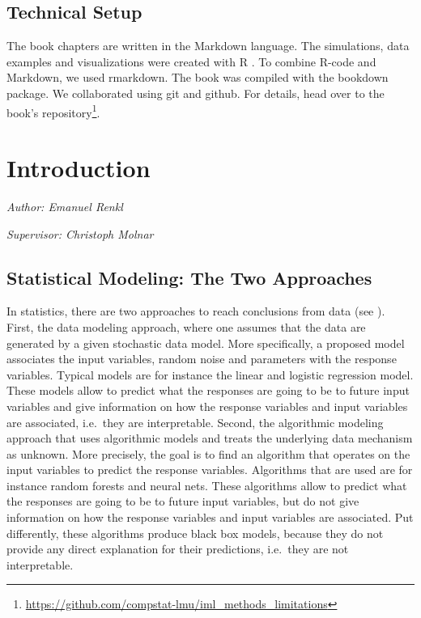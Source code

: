 \documentclass[]{krantz}
\renewcommand{\href}[2]{#2\footnote{\url{#1}}}
\begin{document}
\section*{Technical Setup}\label{technical-setup}


The book chapters are written in the Markdown language. The simulations,
data examples and visualizations were created with R \citep{rlang}. To
combine R-code and Markdown, we used rmarkdown. The book was compiled
with the bookdown package. We collaborated using git and github. For
details, head over to the
\href{https://github.com/compstat-lmu/iml_methods_limitations}{book's
repository}.

\chapter{Introduction}\label{introduction}

\emph{Author: Emanuel Renkl}

\emph{Supervisor: Christoph Molnar}

\section{Statistical Modeling: The Two
Approaches}\label{statistical-modeling-the-two-approaches}

In statistics, there are two approaches to reach conclusions from data
(see \citet{breiman2001}). First, the data modeling approach, where one
assumes that the data are generated by a given stochastic data model.
More specifically, a proposed model associates the input variables,
random noise and parameters with the response variables. Typical models
are for instance the linear and logistic regression model. These models
allow to predict what the responses are going to be to future input
variables and give information on how the response variables and input
variables are associated, i.e.~they are interpretable. Second, the
algorithmic modeling approach that uses algorithmic models and treats
the underlying data mechanism as unknown. More precisely, the goal is to
find an algorithm that operates on the input variables to predict the
response variables. Algorithms that are used are for instance random
forests and neural nets. These algorithms allow to predict what the
responses are going to be to future input variables, but do not give
information on how the response variables and input variables are
associated. Put differently, these algorithms produce black box models,
because they do not provide any direct explanation for their
predictions, i.e.~they are not interpretable.
\end{document}
